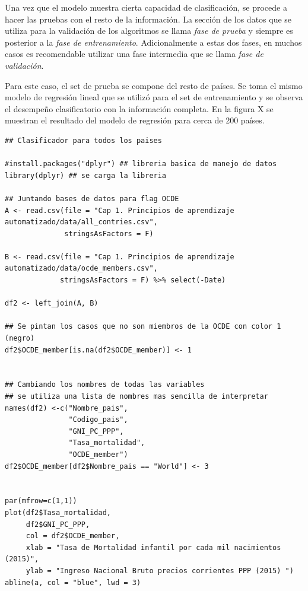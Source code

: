 \documentclass[letterpaper,12pt, spanish, oneside]{book} %
\begin{document}
Una vez que el modelo muestra cierta capacidad de clasificación, se procede a hacer las pruebas con el resto de la información. La sección de los datos que se utiliza para la validación de los algoritmos se llama \textit{fase de prueba} y siempre es posterior a la \textit{fase de entrenamiento}. Adicionalmente a estas dos fases, en muchos casos es recomendable utilizar una fase intermedia que se llama \textit{fase de validación}.

Para este caso, el set de prueba se compone del resto de países. Se toma el mismo modelo de regresión lineal que se utilizó para el set de entrenamiento y se observa el desempeño clasificatorio con la información completa. En la figura X se muestran el resultado del modelo de regresión para cerca de 200 países.

\begin{lstlisting}
## Clasificador para todos los paises

#install.packages("dplyr") ## libreria basica de manejo de datos
library(dplyr) ## se carga la libreria

## Juntando bases de datos para flag OCDE
A <- read.csv(file = "Cap 1. Principios de aprendizaje automatizado/data/all_contries.csv",
              stringsAsFactors = F)

B <- read.csv(file = "Cap 1. Principios de aprendizaje automatizado/data/ocde_members.csv",
             stringsAsFactors = F) %>% select(-Date)

df2 <- left_join(A, B)

## Se pintan los casos que no son miembros de la OCDE con color 1 (negro)
df2$OCDE_member[is.na(df2$OCDE_member)] <- 1


## Cambiando los nombres de todas las variables
## se utiliza una lista de nombres mas sencilla de interpretar
names(df2) <-c("Nombre_pais",
               "Codigo_pais",
               "GNI_PC_PPP",
               "Tasa_mortalidad",
               "OCDE_member")
df2$OCDE_member[df2$Nombre_pais == "World"] <- 3


par(mfrow=c(1,1))
plot(df2$Tasa_mortalidad,
     df2$GNI_PC_PPP,
     col = df2$OCDE_member,
     xlab = "Tasa de Mortalidad infantil por cada mil nacimientos (2015)",
     ylab = "Ingreso Nacional Bruto precios corrientes PPP (2015) ")
abline(a, col = "blue", lwd = 3)
\end{lstlisting}
\end{document}

